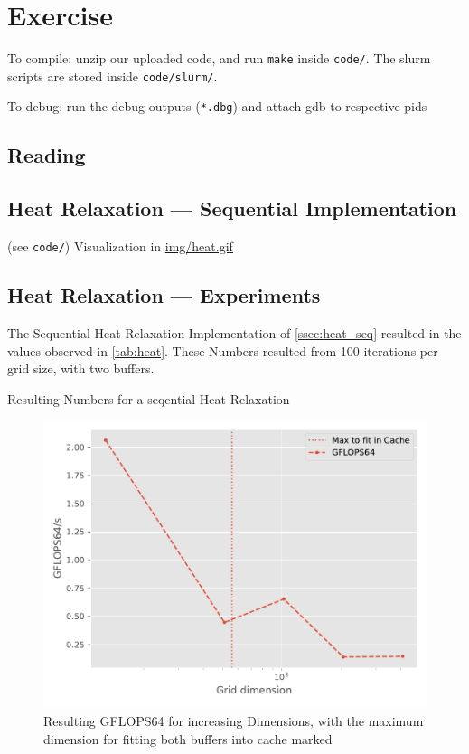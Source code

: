 \documentclass[]{scrartcl}
\newcommand{\exercise}{Exercise \thesection}
\begin{document}
\section*{\exercise}

To compile: unzip our uploaded code, and run \verb|make| inside \verb|code/|.
The slurm scripts are stored inside \verb|code/slurm/|.

To debug: run the debug outputs (\verb|*.dbg|) and attach gdb to respective pids

\subsection{Reading}
\subsection{Heat Relaxation --- Sequential Implementation}\label{ssec:heat_seq}
(see \verb|code/|)
Visualization in \href{./img/heat.gif}{img/heat.gif}
\subsection{Heat Relaxation --- Experiments}
The Sequential Heat Relaxation Implementation of \autoref{ssec:heat_seq} resulted in the values observed in \autoref{tab:heat}.
These Numbers resulted from 100 iterations per grid size, with two buffers.
\begin{table}[ht]
    \centering
    \caption{Resulting Numbers for a seqential Heat Relaxation}\label{tab:heat}
    
\end{table}

\begin{figure}[H]
    \centering
    \includegraphics[]{img/heat.pdf}
    \caption{Resulting GFLOPS64 for increasing Dimensions, with the maximum dimension for fitting both buffers into cache marked}\label{fig:heat}
\end{figure}
\end{document}
